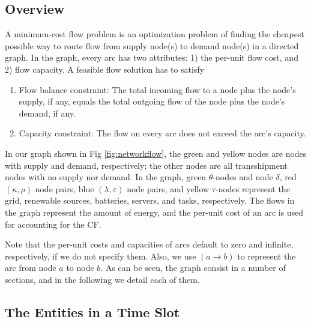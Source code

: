 \documentclass[conference, 10pt, ﬁnal, letterpaper, twocolumn]{IEEEtran}
\begin{document}
\subsection{Overview}
A minimum-cost flow problem is an optimization problem of finding the cheapest possible way to route flow from supply node(s) to demand node(s) in a directed graph. In the graph, every arc has two attributes: 1) the per-unit flow cost, and 2) flow capacity. A feasible flow solution has to satisfy
\begin{enumerate}
    \item Flow balance constraint: The total incoming flow to a node plus the node's supply, if any, equals the total outgoing flow of the node plus the node's demand, if any. 
    \item Capacity constraint: The flow on every arc does not exceed the arc's capacity.
\end{enumerate}

In our graph shown in Fig \ref{fig:networkflow}, the green and yellow nodes are nodes with supply and demand, respectively; the other nodes are all transshipment nodes with no supply nor demand. In the graph, green $\theta$-nodes and node $\delta$, red $(\kappa, \rho)$ node pairs, blue $(\lambda, \varepsilon)$ node pairs, and yellow $\tau$-nodes represent the grid, renewable sources, batteries, servers, and tasks, respectively. The flows in the graph represent the amount of energy, and the per-unit cost of an arc is used for accounting for the CF.

Note that the per-unit costs and capacities of arcs default to zero and infinite, respectively, if we do not specify them. Also, we use $(a\rightarrow b)$ to represent the arc from node $a$ to node $b$. As can be seen, the graph consist in a number of sections, and in the following we detail each of them.

\subsection{The Entities in a Time Slot} \label{sub-A}
\end{document}
